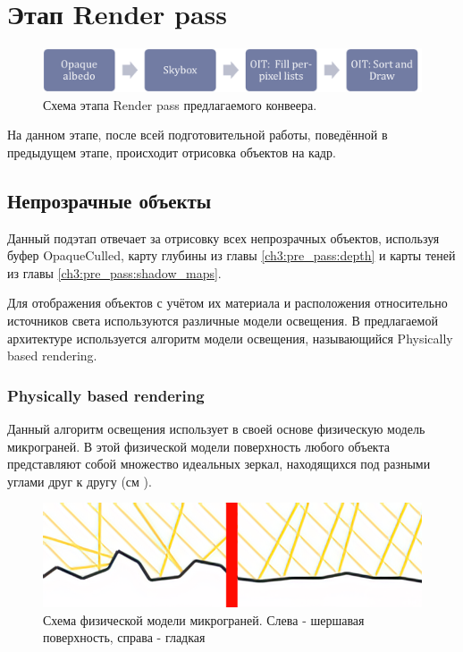 \section{Этап Render pass} \label{ch3:render_pass}
	\begin{figure}[ht!] 
		\center
		\includegraphics [scale=0.4] {my_folder/images//renderpass_schema}	
		\caption{Схема этапа Render pass предлагаемого конвеера.} 
		\label{fig:renderpass_schema}
	\end{figure}
	
	На данном этапе, после всей подготовительной работы, поведённой в предыдущем этапе, происходит отрисовка объектов на кадр.
	
	\subsection{Непрозрачные объекты} \label{ch3:render_pass:opaque}
		Данный подэтап отвечает за отрисовку всех непрозрачных объектов, используя буфер OpaqueCulled, карту глубины из главы \ref{ch3:pre_pass:depth} и карты теней из главы \ref{ch3:pre_pass:shadow_maps}.
		
		Для отображения объектов с учётом их материала и расположения относительно источников света используются различные модели освещения. В предлагаемой архитектуре используется алгоритм модели освещения, называющийся Physically based rendering.
	
		\subsubsection{Physically based rendering} \label{ch3:render_pass:opaque:pbr}
			Данный алгоритм освещения использует в своей основе физическую модель микрограней. В этой физической модели поверхность любого объекта представляют собой множество идеальных зеркал, находящихся под разными углами друг к другу (см ).
			
			\begin{figure}[ht!] 
				\center
				\includegraphics [scale=0.4] {my_folder/images//microfacet}	
				\caption{Схема физической модели микрограней. Слева - шершавая поверхность, справа - гладкая} 
				\label{fig:microfacet}
			\end{figure}
			
